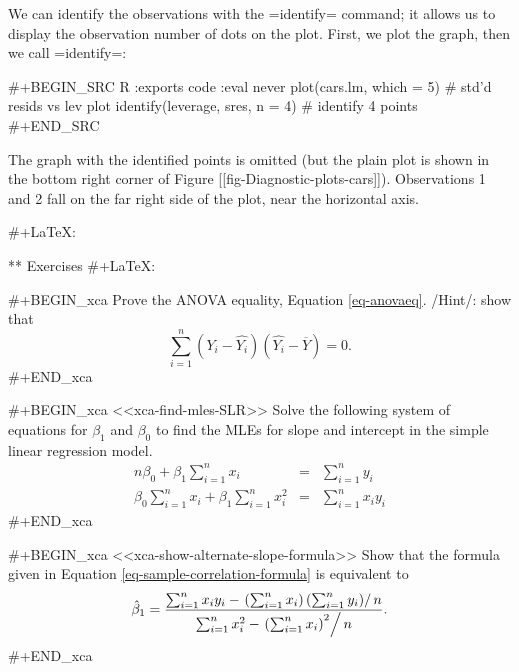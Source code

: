 We can identify the observations with the =identify= command; it
allows us to display the observation number of dots on the
plot. First, we plot the graph, then we call =identify=:

#+BEGIN_SRC R :exports code :eval never
plot(cars.lm, which = 5)          # std'd resids vs lev plot
identify(leverage, sres, n = 4)   # identify 4 points
#+END_SRC

The graph with the identified points is omitted (but the plain plot is
shown in the bottom right corner of Figure
[[fig-Diagnostic-plots-cars]]). Observations 1 and 2 fall on the far right
side of the plot, near the horizontal axis.

#+LaTeX: \newpage{}

** Exercises
#+LaTeX: \setcounter{thm}{0}

#+BEGIN_xca
Prove the ANOVA equality, Equation \eqref{eq-anovaeq}. /Hint/:
show that
\[
\sum_{i=1}^{n}(Y_{i}-\hat{Y_{i}})(\hat{Y_{i}}-\overline{Y})=0.
\]
#+END_xca

#+BEGIN_xca
<<xca-find-mles-SLR>> Solve the following system of equations for
\(\beta_{1}\) and \(\beta_{0}\) to find the MLEs for slope and
intercept in the simple linear regression model.
\begin{eqnarray*}
n\beta_{0}+\beta_{1}\sum_{i=1}^{n}x_{i} & = & \sum_{i=1}^{n}y_{i}\\
\beta_{0}\sum_{i=1}^{n}x_{i}+\beta_{1}\sum_{i=1}^{n}x_{i}^{2} & = & \sum_{i=1}^{n}x_{i}y_{i}
\end{eqnarray*}
#+END_xca

#+BEGIN_xca
<<xca-show-alternate-slope-formula>> Show that the formula given in
Equation \eqref{eq-sample-correlation-formula} is equivalent to \[
\hat{\beta}_{1} =
\frac{\sum_{i=1}^{n}x_{i}y_{i}-\left.\left(\sum_{i=1}^{n}x_{i}\right)\left(\sum_{i=1}^{n}y_{i}\right)\right/
n}{\sum_{i=1}^{n}x_{i}^{2}-\left.\left(\sum_{i=1}^{n}x_{i}\right)^{2}\right/
n}.  \]
#+END_xca
